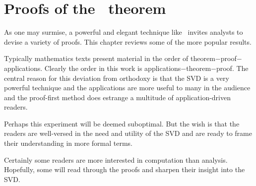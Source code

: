\chapter[Proofs]{Proofs of the \svdl \ theorem}
As one may surmise, a powerful and elegant technique like \svdp \ invites analysts to devise a variety of proofs. This chapter reviews some of the more popular results.

Typically mathematics texts present material in the order of theorem$-$proof$-$applications. Clearly the order in this work is applications$-$theorem$-$proof. The central reason for this deviation from orthodoxy is that the SVD is a very powerful technique and the applications are more useful to many in the audience and the proof-first method does estrange a multitude of application-driven readers.  

Perhaps this experiment will be deemed suboptimal. But the wish is that the readers are well-versed in the need and utility of the SVD and are ready to frame their understanding in more formal terms. 

Certainly some readers are more interested in computation than analysis. Hopefully, some will read through the proofs and sharpen their insight into the SVD.





\endinput